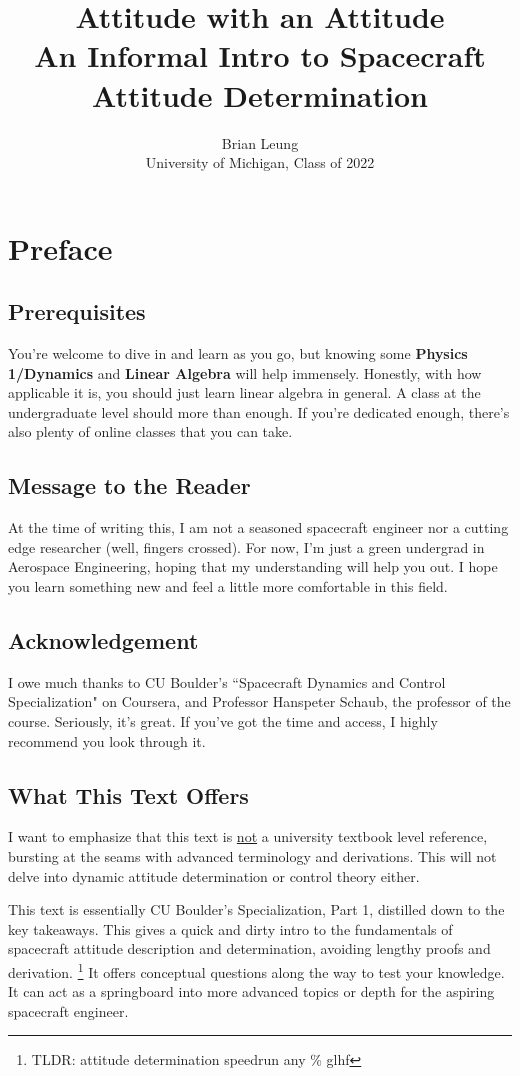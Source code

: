 \documentclass[a4paper,14pt]{extreport}
\title{Attitude with an Attitude \\
\large An Informal Intro to Spacecraft Attitude Determination}
\author{Brian Leung\\University of Michigan, Class of 2022}
\begin{document}
\maketitle
\setcounter{tocdepth}{0}
\tableofcontents{}
\chapter{Preface}
\section{Prerequisites}
You're welcome to dive in and learn as you go, but knowing some \textbf{Physics 1/Dynamics} and \textbf{Linear Algebra} will help immensely. Honestly, with how applicable it is, you should just learn linear algebra in general. A class at the undergraduate level should more than enough. If you're dedicated enough, there's also plenty of online classes that you can take.

\section{Message to the Reader}
At the time of writing this, I am not a seasoned spacecraft engineer nor a cutting edge researcher (well, fingers crossed). For now, I'm just a green undergrad in Aerospace Engineering, hoping that my understanding  will help you out. I hope you learn something new and feel a little more comfortable in this field.

\section{Acknowledgement}
I owe much thanks to CU Boulder's ``Spacecraft Dynamics and Control Specialization" on Coursera, and Professor Hanspeter Schaub, the professor of the course. Seriously, it's great. If you've got the time and access, I highly recommend you look through it.

\section{What This Text Offers}
I want to emphasize that this text is \underline{not} a university textbook level reference, bursting at the seams with advanced terminology and derivations. This will not delve into dynamic attitude determination or control theory either. 

This text is essentially CU Boulder's Specialization, Part 1, distilled down to the key takeaways. This gives a quick and dirty intro to the fundamentals of spacecraft attitude description and determination, avoiding lengthy proofs and derivation. \footnote{TLDR: attitude determination speedrun any \% glhf} It offers conceptual questions along the way to test your knowledge. It can act as a springboard into more advanced topics or depth for the aspiring spacecraft engineer.
\end{document}
